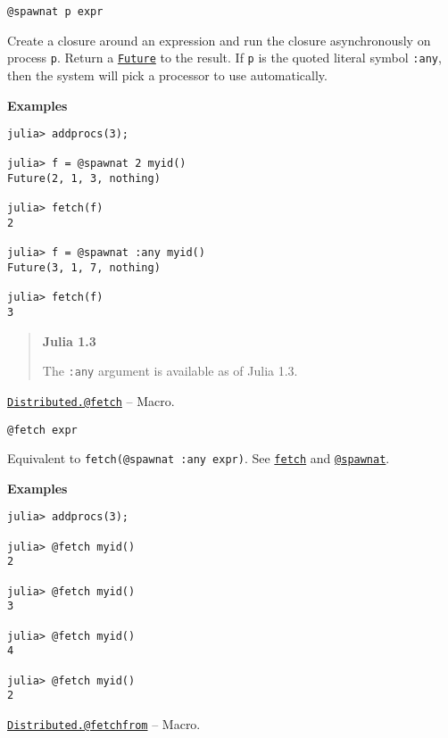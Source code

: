 \begin{adjustwidth}{2em}{0pt}


\begin{verbatim}
@spawnat p expr
\end{verbatim}

Create a closure around an expression and run the closure asynchronously on process \texttt{p}. Return a \hyperlink{4170271048165085864}{\texttt{Future}} to the result. If \texttt{p} is the quoted literal symbol \texttt{:any}, then the system will pick a processor to use automatically.

\textbf{Examples}


\begin{verbatim}
julia> addprocs(3);

julia> f = @spawnat 2 myid()
Future(2, 1, 3, nothing)

julia> fetch(f)
2

julia> f = @spawnat :any myid()
Future(3, 1, 7, nothing)

julia> fetch(f)
3
\end{verbatim}

\begin{quote}
\textbf{Julia 1.3}

The \texttt{:any} argument is available as of Julia 1.3.

\end{quote}


\end{adjustwidth}
\hypertarget{12924100318586144753}{} 
\hyperlink{12924100318586144753}{\texttt{Distributed.@fetch}}  -- {Macro.}

\begin{adjustwidth}{2em}{0pt}


\begin{verbatim}
@fetch expr
\end{verbatim}

Equivalent to \texttt{fetch(@spawnat :any expr)}. See \hyperlink{11007884648860062495}{\texttt{fetch}} and \hyperlink{11231712027010946923}{\texttt{@spawnat}}.

\textbf{Examples}


\begin{verbatim}
julia> addprocs(3);

julia> @fetch myid()
2

julia> @fetch myid()
3

julia> @fetch myid()
4

julia> @fetch myid()
2
\end{verbatim}



\end{adjustwidth}
\hypertarget{4668231420319368373}{} 
\hyperlink{4668231420319368373}{\texttt{Distributed.@fetchfrom}}  -- {Macro.}

